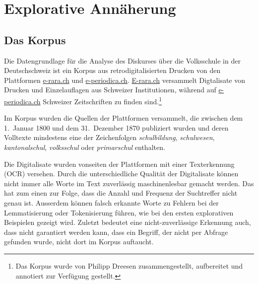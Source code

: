 


\chapter{Explorative Annäherung} %
\label{Chapter4} %

\section{Das Korpus}

Die Datengrundlage für die Analyse des Diskurses über die Volksschule in der Deutschschweiz ist ein Korpus aus retrodigitalisierten Drucken von den Plattformen \href{https://www.e-rara.ch/}{e-rara.ch} und \href{https://e-periodica.ch}{e-periodica.ch}. \href{https://e-rara.ch}{E-rara.ch} versammelt Digtalisate von Drucken und Einzelauflagen aus Schweizer Institutionen, während auf \href{https://e-periodica.ch}{e-periodica.ch} Schweizer Zeitschriften zu finden sind.\footnote{Das Korpus wurde von Philipp Dreesen zusammengestellt, aufbereitet und annotiert zur Verfügung gestellt.}

Im Korpus wurden die Quellen der Plattformen versammelt, die zwischen dem 1.~Januar 1800 und dem 31.~Dezember 1870 publiziert wurden und deren Volltexte mindestens eine der Zeichenfolgen \textit{schulbildung}, \textit{schulwesen}, \textit{kantonalschul}, \textit{volksschul} oder \textit{primarschul} enthalten.

Die Digitalisate wurden vonseiten der Plattformen mit einer Texterkennung (OCR) versehen. Durch die unterschiedliche Qualität der Digitalisate können nicht immer alle Worte im Text zuverlässig maschinenlesbar gemacht werden. Das hat zum einen zur Folge, dass die Anzahl und Frequenz der Suchtreffer nicht genau ist. Ausserdem können falsch erkannte Worte zu Fehlern bei der Lemmatisierung oder Tokenisierung führen, wie bei den ersten explorativen Beispielen gezeigt wird. Zuletzt bedeutet eine nicht-zuverlässige Erkennung auch, dass nicht garantiert werden kann, dass ein Begriff, der nicht per Abfrage gefunden wurde, nicht dort im Korpus auftaucht.

